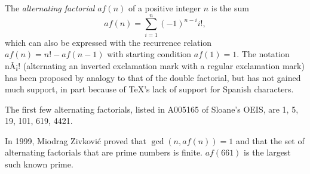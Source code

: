 \documentclass[12pt]{article}
\begin{document}
The \emph{alternating factorial} $af(n)$ of a positive integer $n$ is the sum $$af(n) = \sum_{i = 1}^n (-1)^{n - i}i!,$$ which can also be expressed with the recurrence relation $af(n) = n! - af(n - 1)$ with starting condition $af(1) = 1$. The notation nÂ¡! (alternating an inverted exclamation mark with a regular exclamation mark) has been proposed by analogy to that of the double factorial, but has not gained much support, in part because of TeX's lack of support for Spanish characters.

The first few alternating factorials, listed in A005165 of Sloane's OEIS, are 1, 5, 19, 101, 619, 4421.

In 1999, Miodrag Zivkovi\'c proved that $\gcd(n, af(n)) = 1$ and that the set of alternating factorials that are prime numbers is finite. $af(661)$ is the largest such known prime.
\end{document}
